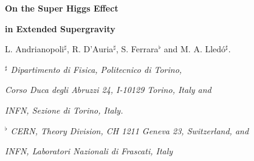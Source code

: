 \documentclass[a4paper,12pt]{article}
\begin{document}

\newcommand{\R}{\mathbb{R}}
\newcommand{\C}{\mathbb{C}}
\newcommand{\Z}{\mathbb{Z}}
\newcommand{\Hb}{\mathbb{H}}
\newcommand{\id}{\relax{\rm 1\kern-.35em 1}}


\newcommand{\rUSp}{\mathrm{USp}}
\newcommand{\rO}{\mathrm{O}}
\newcommand{\rSO}{\mathrm{SO}}
\newcommand{\rSU}{\mathrm{SU}}
\newcommand{\rU}{\mathrm{U}}
\newcommand{\rSL}{\mathrm{SL}}
\newcommand{\rE}{\mathrm{E}}

\newcommand{\fsl}{\mathfrak{sl}}
\newcommand{\fso}{\mathfrak{so}}
\newcommand{\ft}{\mathfrak{t}}

\newcommand{\be}{\mathbf{E}}

\vskip 1.5cm


  \centerline{\LARGE \bf On the  Super Higgs Effect  }

  \bigskip

   \centerline{\LARGE \bf in Extended  Supergravity }





 \vskip 3cm
\centerline{L. Andrianopoli$^\sharp$, R. D'Auria$^\sharp$,  S.
Ferrara$^\flat$ and M. A. Lled\'o$^\sharp$.}

\vskip 1.5cm



\centerline{\it $^\sharp$ Dipartimento di Fisica, Politecnico di
Torino,} \centerline{\it Corso Duca degli Abruzzi 24, I-10129
Torino, Italy and } \centerline{\it   INFN, Sezione di Torino,
Italy. }

\medskip



\centerline{\it $^\flat$ CERN, Theory Division, CH 1211 Geneva 23,
Switzerland, and } \centerline{\it INFN, Laboratori Nazionali di
Frascati, Italy}





\vskip 1cm

\begin{abstract}
We consider the reduction of supersymmetry in $N$-extended four
dimensional supergravity via the super Higgs mechanism in theories
without cosmological constant.
 We provide an analysis largely based on the properties of long and short multiplets of Poincar\'e supersymmetry.
 Examples of the super Higgs phenomenon are realized in spontaneously broken $N=8$ supergravity through the
  Scherk-Schwarz mechanism and in superstring compactification in presence of brane fluxes. In many models the
   massive vectors count the difference in number of the translation isometries of the scalar $\sigma$-model
    geometries in the broken and unbroken phase.
\end{abstract}
\end{document}
